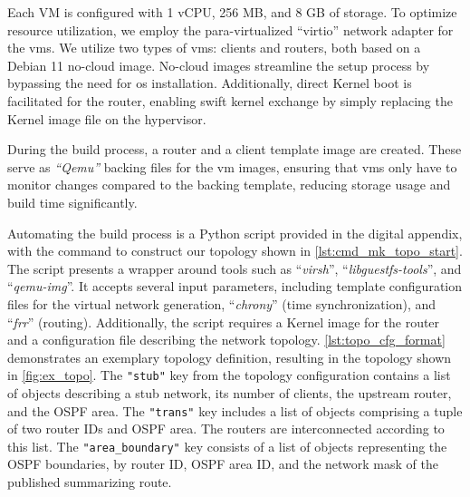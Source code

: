 Each VM is configured with 1 vCPU, 256 MB, and 8 GB of storage.
To optimize resource utilization, we employ the para-virtualized ``virtio''
    network adapter for the \glspl{vm}.
We utilize two types of \glspl{vm}: clients and routers, both based on a Debian
    11 no-cloud image.
No-cloud images streamline the setup process by bypassing the need for \gls{os}
    installation.
Additionally, direct Kernel boot is facilitated for the router, enabling swift
    kernel exchange by simply replacing the Kernel image file on the
    hypervisor.

During the build process, a router and a client template image are created.
These serve as \textit{``Qemu''} backing files for the \gls{vm} images,
    ensuring that \glspl{vm} only have to monitor changes compared to the
    backing template, reducing storage usage and build time significantly.

Automating the build process is a Python script provided in the digital
    appendix, with the command to construct our topology shown in
    \autoref{lst:cmd_mk_topo_start}.
The script presents a wrapper around tools such as ``\textit{virsh}'',
    ``\textit{libguestfs-tools}'', and ``\textit{qemu-img}''.
It accepts several input parameters, including template configuration files
    for the virtual network generation, ``\textit{chrony}'' (time
    synchronization), and ``\textit{frr}'' (routing).
Additionally, the script requires a Kernel image for the router and a
    configuration file describing the network topology.
\autoref{lst:topo_cfg_format} demonstrates an exemplary topology definition,
    resulting in the topology shown in \autoref{fig:ex_topo}.
The  \texttt{"stub"} key from the topology configuration contains a list of
    objects describing a stub network, its number of clients, the upstream
    router, and the OSPF area.
The \texttt{"trans"} key includes a list of objects comprising a tuple of two
    router IDs and OSPF area.
The routers are interconnected according to this list.
The \texttt{"area\_boundary"} key consists of a list of objects representing
    the OSPF boundaries, by router ID, OSPF area ID, and the network mask
    of the published summarizing route.

